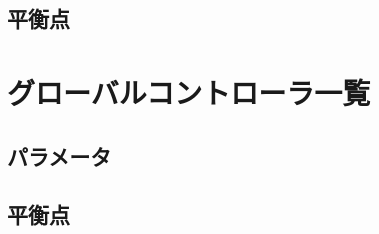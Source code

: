\documentclass[landscape]{report}
\begin{document}
\subsection{平衡点}



\section{グローバルコントローラ一覧}


\subsection{パラメータ}


\subsection{平衡点}

\end{document}
